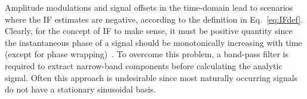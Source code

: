 \documentclass[11pt,draftcls,onecolumn]{IEEEtran}
\begin{document}

Amplitude modulations and signal offsets in the time-domain lead to scenarios where the IF estimates are negative, according to the definition in Eq.~\ref{eq:IFdef}. Clearly, for the concept of IF to make sense, it must be positive quantity since the instantaneous phase of a signal should be monotonically increasing with time (except for phase wrapping)~\cite{Huang1998}. To overcome this problem, a band-pass filter is required to extract narrow-band components before calculating the analytic signal. Often this approach is undesirable since most naturally occurring signals do not have a stationary sinusoidal basis. 
\end{document}
